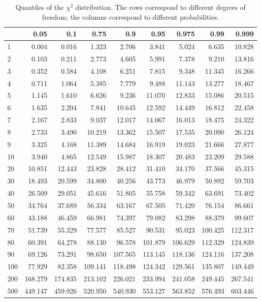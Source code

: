 \documentclass[
  12pt,
]{book}
\theoremstyle{definition}
\theoremstyle{definition}
\theoremstyle{definition}
\theoremstyle{definition}
\theoremstyle{remark}
\begin{document}
\begin{table}

\caption{\label{tab:Chi2}Quantiles of the $\chi^2$ distribution. The rows correspond to different degrees of freedom; the columns correspond to different probabilities.}
\centering
\begin{tabular}[t]{l|r|r|r|r|r|r|r|r}
\hline
  & 0.05 & 0.1 & 0.75 & 0.9 & 0.95 & 0.975 & 0.99 & 0.999\\
\hline
1 & 0.004 & 0.016 & 1.323 & 2.706 & 3.841 & 5.024 & 6.635 & 10.828\\
\hline
2 & 0.103 & 0.211 & 2.773 & 4.605 & 5.991 & 7.378 & 9.210 & 13.816\\
\hline
3 & 0.352 & 0.584 & 4.108 & 6.251 & 7.815 & 9.348 & 11.345 & 16.266\\
\hline
4 & 0.711 & 1.064 & 5.385 & 7.779 & 9.488 & 11.143 & 13.277 & 18.467\\
\hline
5 & 1.145 & 1.610 & 6.626 & 9.236 & 11.070 & 12.833 & 15.086 & 20.515\\
\hline
6 & 1.635 & 2.204 & 7.841 & 10.645 & 12.592 & 14.449 & 16.812 & 22.458\\
\hline
7 & 2.167 & 2.833 & 9.037 & 12.017 & 14.067 & 16.013 & 18.475 & 24.322\\
\hline
8 & 2.733 & 3.490 & 10.219 & 13.362 & 15.507 & 17.535 & 20.090 & 26.124\\
\hline
9 & 3.325 & 4.168 & 11.389 & 14.684 & 16.919 & 19.023 & 21.666 & 27.877\\
\hline
10 & 3.940 & 4.865 & 12.549 & 15.987 & 18.307 & 20.483 & 23.209 & 29.588\\
\hline
20 & 10.851 & 12.443 & 23.828 & 28.412 & 31.410 & 34.170 & 37.566 & 45.315\\
\hline
30 & 18.493 & 20.599 & 34.800 & 40.256 & 43.773 & 46.979 & 50.892 & 59.703\\
\hline
40 & 26.509 & 29.051 & 45.616 & 51.805 & 55.758 & 59.342 & 63.691 & 73.402\\
\hline
50 & 34.764 & 37.689 & 56.334 & 63.167 & 67.505 & 71.420 & 76.154 & 86.661\\
\hline
60 & 43.188 & 46.459 & 66.981 & 74.397 & 79.082 & 83.298 & 88.379 & 99.607\\
\hline
70 & 51.739 & 55.329 & 77.577 & 85.527 & 90.531 & 95.023 & 100.425 & 112.317\\
\hline
80 & 60.391 & 64.278 & 88.130 & 96.578 & 101.879 & 106.629 & 112.329 & 124.839\\
\hline
90 & 69.126 & 73.291 & 98.650 & 107.565 & 113.145 & 118.136 & 124.116 & 137.208\\
\hline
100 & 77.929 & 82.358 & 109.141 & 118.498 & 124.342 & 129.561 & 135.807 & 149.449\\
\hline
200 & 168.279 & 174.835 & 213.102 & 226.021 & 233.994 & 241.058 & 249.445 & 267.541\\
\hline
500 & 449.147 & 459.926 & 520.950 & 540.930 & 553.127 & 563.852 & 576.493 & 603.446\\
\hline
\end{tabular}
\end{table}
\end{document}
